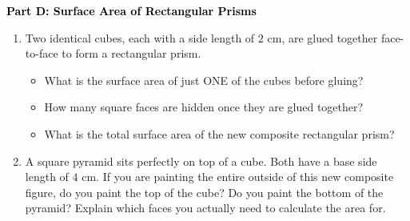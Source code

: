 \documentclass[12pt, letterpaper, fleqn]{article}
\newcommand{\blank}{\underline{\hspace{2.2cm}}}
\begin{document}
\newpage

\begin{tcolorbox}[colback=customteal!20]
\large\textcolor{black}{\textbf{Part D: Surface Area of Rectangular Prisms}}
\end{tcolorbox}

\vspace{3mm}

\begin{enumerate}[itemsep=4.2cm, leftmargin=0.6cm, resume]
\item Two identical cubes, each with a side length of $2\text{ cm}$, are glued together face-to-face to form a rectangular prism.
\begin{itemize}
\item What is the surface area of just ONE of the cubes before gluing? \blank
\item How many square faces are hidden once they are glued together? \blank
\item What is the total surface area of the new composite rectangular prism? \blank
\end{itemize}
\item A square pyramid sits perfectly on top of a cube. Both have a base side length of $4\text{ cm}$. If you are painting the entire outside of this new composite figure, do you paint the top of the cube? Do you paint the bottom of the pyramid? Explain which faces you actually need to calculate the area for.
\end{enumerate}
\end{document}

